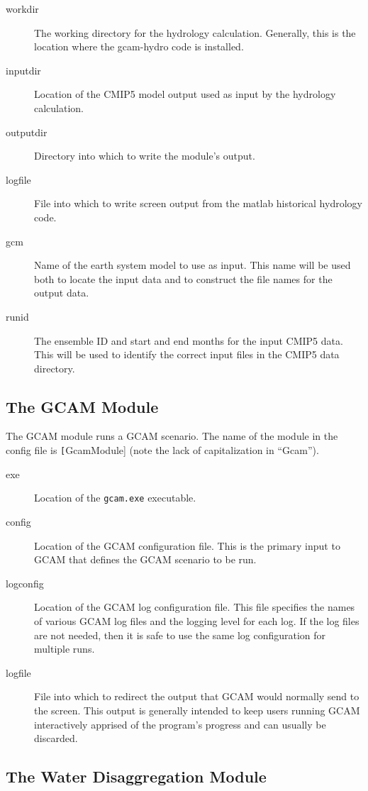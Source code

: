 \documentclass[11pt]{article}
\begin{document}
\begin{description}
\item[workdir] The working directory for the hydrology calculation.
  Generally, this is the location where the gcam-hydro code is
  installed.
\item[inputdir] Location of the CMIP5 model output used as input by
  the hydrology calculation.
\item[outputdir] Directory into which to write the module's output.
\item[logfile] File into which to write screen output from the
  matlab historical hydrology code.
\item[gcm] Name of the earth system model to use as input.  This
  name will be used both to locate the input data and to construct
  the file names for the output data.
\item[runid] The ensemble ID and start and end months for the input
  CMIP5 data.  This will be used to identify the correct input files
  in the CMIP5 data directory.
\end{description}

\subsection{The {GCAM} Module}
The GCAM module runs a GCAM scenario.  The name of the module in the
config file is \texttt[GcamModule] (note the lack of capitalization in
``Gcam'').

\begin{description}
\item[exe] Location of the \texttt{gcam.exe} executable.
\item[config] Location of the GCAM configuration file.  This is the
  primary input to GCAM that defines the GCAM scenario to be run.
\item[logconfig] Location of the GCAM log configuration file.  This
  file specifies the names of various GCAM log files and the logging
  level for each log.  If the log files are not needed, then it is
  safe to use the same log configuration for multiple runs.
\item[logfile] File into which to redirect the output that GCAM would
  normally send to the screen.  This output is generally intended to
  keep users running GCAM interactively apprised of the program's
  progress and can usually be discarded.
\end{description}

\subsection{The Water Disaggregation Module}
\end{document}
